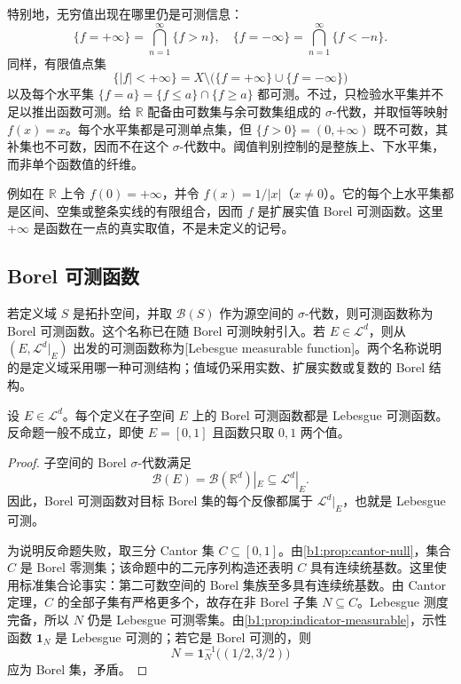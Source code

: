 特别地，无穷值出现在哪里仍是可测信息：
\[
\{f=+\infty\}=\bigcap_{n=1}^{\infty}\{f>n\},
\quad
\{f=-\infty\}=\bigcap_{n=1}^{\infty}\{f<-n\}.
\]
同样，有限值点集
\[
\{|f|<+\infty\}
=X\setminus\bigl(\{f=+\infty\}\cup\{f=-\infty\}\bigr)
\]
以及每个水平集 \(\{f=a\}=\{f\leq a\}\cap\{f\geq a\}\) 都可测。不过，只检验水平集并不足以推出函数可测。给 \(\mathbb R\) 配备由可数集与余可数集组成的 \(\sigma\)-代数，并取恒等映射 \(f(x)=x\)。每个水平集都是可测单点集，但
\(\{f>0\}=(0,+\infty)\) 既不可数，其补集也不可数，因而不在这个 \(\sigma\)-代数中。阈值判别控制的是整族上、下水平集，而非单个函数值的纤维。

\ProseParagraphBreak

例如在 \(\mathbb R\) 上令 \(f(0)=+\infty\)，并令
\(f(x)=1/|x|\)（\(x\ne0\)）。它的每个上水平集都是区间、空集或整条实线的有限组合，因而 \(f\) 是扩展实值 Borel 可测函数。这里 \(+\infty\) 是函数在一点的真实取值，不是未定义的记号。

\subsection{Borel 可测函数}
\label{b1:subsec:040102}

若定义域 \(S\) 是拓扑空间，并取 \(\mathcal B(S)\) 作为源空间的 \(\sigma\)-代数，则可测函数称为 Borel 可测函数。这个名称已在随 Borel 可测映射引入。若 \(E\in\mathcal L^d\)，则从
\((E,\mathcal L^d|_E)\) 出发的可测函数称为[Lebesgue measurable function]。两个名称说明的是定义域采用哪一种可测结构；值域仍采用实数、扩展实数或复数的 Borel 结构。

\begin{proposition}
\label{b1:prop:borel-implies-lebesgue-function}
设 \(E\in\mathcal L^d\)。每个定义在子空间 \(E\) 上的 Borel 可测函数都是 Lebesgue 可测函数。反命题一般不成立，即使 \(E=[0,1]\) 且函数只取 \(0,1\) 两个值。
\end{proposition}
\begin{proof}
子空间的 Borel \(\sigma\)-代数满足
\[
\mathcal B(E)=\mathcal B(\mathbb R^d)|_E
\subseteq\mathcal L^d|_E.
\]
因此，Borel 可测函数对目标 Borel 集的每个反像都属于 \(\mathcal L^d|_E\)，也就是 Lebesgue 可测。

为说明反命题失败，取三分 Cantor 集 \(C\subseteq[0,1]\)。由\cref{b1:prop:cantor-null}，集合 \(C\) 是 Borel 零测集；该命题中的二元序列构造还表明 \(C\) 具有连续统基数。这里使用标准集合论事实：第二可数空间的 Borel 集族至多具有连续统基数。由 Cantor 定理，\(C\) 的全部子集有严格更多个，故存在非 Borel 子集 \(N\subseteq C\)。Lebesgue 测度完备，所以 \(N\) 仍是 Lebesgue 可测零集。由\cref{b1:prop:indicator-measurable}，示性函数 \(\mathbf 1_N\) 是 Lebesgue 可测的；若它是 Borel 可测的，则
\[
N=\mathbf 1_N^{-1}\bigl((1/2,3/2)\bigr)
\]
应为 Borel 集，矛盾。
\end{proof}

